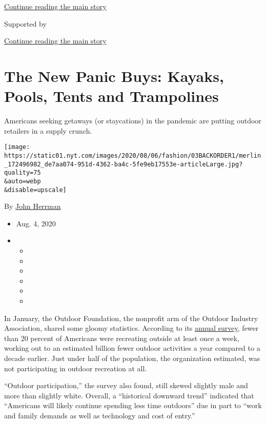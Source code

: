 \protect\hyperlink{after-top}{Continue reading the main story}

Supported by

\protect\hyperlink{after-sponsor}{Continue reading the main story}

\hypertarget{the-new-panic-buys-kayaks-pools-tents-and-trampolines}{%
\section{The New Panic Buys: Kayaks, Pools, Tents and
Trampolines}\label{the-new-panic-buys-kayaks-pools-tents-and-trampolines}}

Americans seeking getaways (or staycations) in the pandemic are putting
outdoor retailers in a supply crunch.

\texttt{[image: https://static01.nyt.com/images/2020/08/06/fashion/03BACKORDER1/merlin\_172496982\_de7aa074-951d-4362-ba4c-5fe9eb17553e-articleLarge.jpg?quality=75\\\&auto=webp\\\&disable=upscale]}

By \href{https://www.nytimes.com/by/john-herrman}{John Herrman}

\begin{itemize}
\item
  Aug. 4, 2020
\item
  \begin{itemize}
  \item
  \item
  \item
  \item
  \item
  \item
  \end{itemize}
\end{itemize}

In January, the Outdoor Foundation, the nonprofit arm of the Outdoor
Industry Association, shared some gloomy statistics. According to its
\href{https://outdoorindustry.org/resource/2019-outdoor-participation-report/}{annual
survey}, fewer than 20 percent of Americans were recreating outside at
least once a week, working out to an estimated billion fewer outdoor
activities a year compared to a decade earlier. Just under half of the
population, the organization estimated, was not participating in outdoor
recreation at all.

``Outdoor participation,'' the survey also found, still skewed slightly
male and more than slightly white. Overall, a ``historical downward
trend'' indicated that ``Americans will likely continue spending less
time outdoors'' due in part to ``work and family demands as well as
technology and cost of entry.''

